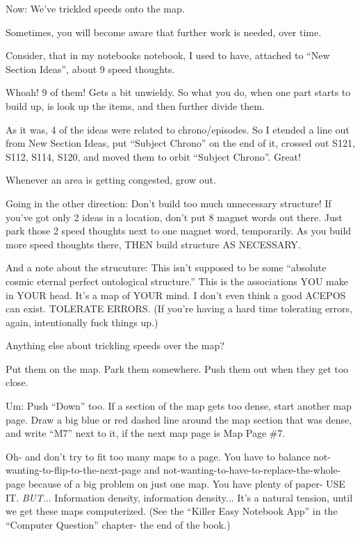 \documentclass[oneside]{book}
\begin{document}
Now: We've trickled speeds onto the map.

Sometimes, you will become aware that further work is needed, over
time.

Consider, that in my notebooks notebook, I used to have, attached to
``New Section Ideas'', about 9 speed thoughts.

Whoah! 9 of them! Gets a bit unwieldy. So what you do, when one part
starts to build up, is look up the items, and then further divide
them.

As it was, 4 of the ideas were related to chrono/episodes. So I
etended a line out from New Section Ideas, put ``Subject Chrono'' on the
end of it, crossed out S121, S112, S114, S120, and moved them to orbit
``Subject Chrono''. Great!

Whenever an area is getting congested, grow out.

Going in the other direction: Don't build too much unnecessary
structure! If you've got only 2 ideas in a location, don't put 8
magnet words out there. Just park those 2 speed thoughts next to one
magnet word, temporarily. As you build more speed thoughts there, THEN
build structure AS NECESSARY.

And a note about the strucuture: This isn't supposed to be some
``absolute cosmic eternal perfect ontological structure.'' This is the
associations YOU make in YOUR head. It's a map of YOUR mind. I don't
even think a good ACEPOS can exist. TOLERATE ERRORS. (If you're having
a hard time tolerating errors, again, intentionally fuck things up.)

Anything else about trickling speeds over the map?

Put them on the map. Park them somewhere. Push them out when they get
too close.

Um: Push ``Down'' too. If a section of the map gets too dense, start
another map page. Draw a big blue or red dashed line around the map
section that was dense, and write ``M7'' next to it, if the next map
page is Map Page \#7.

Oh- and don't try to fit too many maps to a page. You have to balance
not-wanting-to-flip-to-the-next-page and
not-wanting-to-have-to-replace-the-whole-page because of a big problem
on just one map. You have plenty of paper- USE
IT. \emph{BUT}... Information density, information density... It's a
natural tension, until we get these maps computerized. (See the
``Killer Easy Notebook App'' in the ``Computer Question'' chapter- the end
of the book.)
\end{document}
